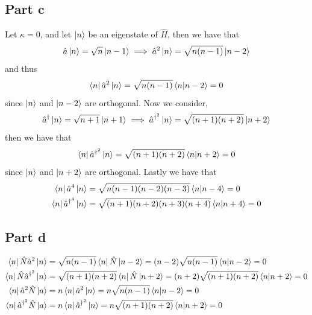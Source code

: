 \documentclass[12pt]{report}
\begin{document}
\subsection*{Part c}
Let $\kappa = 0$, and let $\ket{n}$ be an eigenstate of $\hat{H}$, then we have that
\begin{equation*}
  \hat{a} \ket{n} = \sqrt{n} \ket{n-1} \implies \hat{a}^2 \ket{n} = \sqrt{n(n-1)} \ket{n-2}
\end{equation*}
and thus
\begin{equation*}
  \bra{n}\hat{a}^2\ket{n} = \sqrt{n(n-1)} \braket{n|n-2} = 0
\end{equation*}
since $\ket{n}$ and $\ket{n-2}$ are orthogonal. Now we consider,
\begin{equation*}
  \hat{a}^\dagger \ket{n} = \sqrt{n+1} \ket{n+1} \implies \hat{a}^{\dagger^2} \ket{n} = \sqrt{(n+1)(n+2)} \ket{n+2}
\end{equation*}
then we have that
\begin{equation*}
  \bra{n}\hat{a}^{\dagger^2}\ket{n} = \sqrt{(n+1)(n+2)} \braket{n|n+2} = 0
\end{equation*}
since $\ket{n}$ and $\ket{n+2}$ are orthogonal. Lastly we have that
\begin{align*}
  \bra{n}\hat{a}^4\ket{n} &= \sqrt{n(n-1)(n-2)(n-3)} \braket{n|n-4} = 0 \\
  \bra{n}\hat{a}^{\dagger^4}\ket{n} &= \sqrt{(n+1)(n+2)(n+3)(n+4)} \braket{n|n+4} = 0
\end{align*}

\subsection*{Part d}
\begin{align*}
  \bra{n}\hat{N}\hat{a}^2 \ket{n} &= \sqrt{n(n-1)} \bra{n}\hat{N}\ket{n-2} = (n-2)\sqrt{n(n-1)} \braket{n|n-2} = 0\\
\bra{n}\hat{N}\hat{a}^{\dagger^2} \ket{n} &= \sqrt{(n+1)(n+2)} \bra{n}\hat{N}\ket{n+2} = (n+2)\sqrt{(n+1)(n+2)}\braket{n|n+2} = 0 \\
\bra{n} \hat{a}^2 \hat{N} \ket{a} &= n \bra{n}\hat{a}^2 \ket{n} = n\sqrt{n(n-1)} \braket{n|n-2} = 0 \\
\bra{n} \hat{a}^{\dagger^2} \hat{N} \ket{a} &= n \bra{n}\hat{a}^{\dagger^2} \ket{n} = n\sqrt{(n+1)(n+2)} \braket{n|n+2} = 0
\end{align*}
\end{document}
